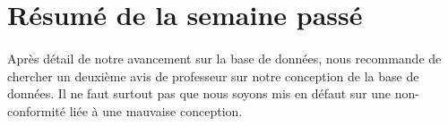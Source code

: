 \documentclass [a4paper] {article}
\begin{document}
\section{Résumé de la semaine passé}
\paragraph*{}
Après détail de notre avancement sur la base de données, \nomTuteurQualite{} nous recommande de chercher un deuxième avis de professeur sur notre conception de la base de données. Il ne faut surtout pas que nous soyons mis en défaut sur une non-conformité liée à une mauvaise conception.

\paragraph*{}
\end{document}
